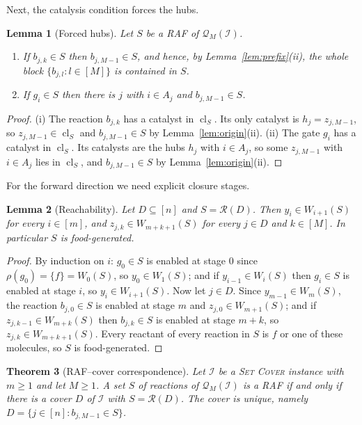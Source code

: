 \documentclass[11pt,a4paper]{article}
\theoremstyle{plain}
\newtheorem{theorem}{Theorem}[section]
\newtheorem{lemma}[theorem]{Lemma}
\theoremstyle{definition}
\theoremstyle{remark}
\newcommand{\cl}{\operatorname{cl}}
\newcommand{\cQ}{\mathcal{Q}}
\newcommand{\cR}{\mathcal{R}}
\newcommand{\cI}{\mathcal{I}}
\newcommand{\SetCover}{\textup{\textsc{Set Cover}}}
\begin{document}
Next, the catalysis condition forces the hubs.

\begin{lemma}[Forced hubs]\label{lem:hub}
Let $S$ be a RAF of $\cQ_M(\cI)$.
\begin{enumerate}[label=(\roman*)]
\item If $b_{j,k}\in S$ then $b_{j,M-1}\in S$, and hence, by Lemma~\ref{lem:prefix}(ii), the whole block $\{b_{j,l}:l\in[M]\}$ is contained in $S$.
\item If $g_i\in S$ then there is $j$ with $i\in A_j$ and $b_{j,M-1}\in S$.
\end{enumerate}
\end{lemma}

\begin{proof}
(i) The reaction $b_{j,k}$ has a catalyst in $\cl_S$. Its only catalyst is $h_j=z_{j,M-1}$, so $z_{j,M-1}\in\cl_S$ and $b_{j,M-1}\in S$ by Lemma~\ref{lem:origin}(ii). (ii) The gate $g_i$ has a catalyst in $\cl_S$. Its catalysts are the hubs $h_j$ with $i\in A_j$, so some $z_{j,M-1}$ with $i\in A_j$ lies in $\cl_S$, and $b_{j,M-1}\in S$ by Lemma~\ref{lem:origin}(ii).
\end{proof}

For the forward direction we need explicit closure stages.

\begin{lemma}[Reachability]\label{lem:reach}
Let $D\subseteq[n]$ and $S=\cR(D)$. Then $y_i\in W_{i+1}(S)$ for every $i\in[m]$, and $z_{j,k}\in W_{m+k+1}(S)$ for every $j\in D$ and $k\in[M]$. In particular $S$ is food-generated.
\end{lemma}

\begin{proof}
By induction on $i$: $g_0\in S$ is enabled at stage $0$ since $\rho(g_0)=\{f\}=W_0(S)$, so $y_0\in W_1(S)$; and if $y_{i-1}\in W_i(S)$ then $g_i\in S$ is enabled at stage $i$, so $y_i\in W_{i+1}(S)$. Now let $j\in D$. Since $y_{m-1}\in W_m(S)$, the reaction $b_{j,0}\in S$ is enabled at stage $m$ and $z_{j,0}\in W_{m+1}(S)$; and if $z_{j,k-1}\in W_{m+k}(S)$ then $b_{j,k}\in S$ is enabled at stage $m+k$, so $z_{j,k}\in W_{m+k+1}(S)$. Every reactant of every reaction in $S$ is $f$ or one of these molecules, so $S$ is food-generated.
\end{proof}

\begin{theorem}[RAF--cover correspondence]\label{thm:iff}
Let $\cI$ be a \SetCover{} instance with $m\ge 1$ and let $M\ge 1$. A set $S$ of reactions of $\cQ_M(\cI)$ is a RAF if and only if there is a cover $D$ of $\cI$ with $S=\cR(D)$. The cover is unique, namely $D=\{j\in[n]: b_{j,M-1}\in S\}$.
\end{theorem}
\end{document}
